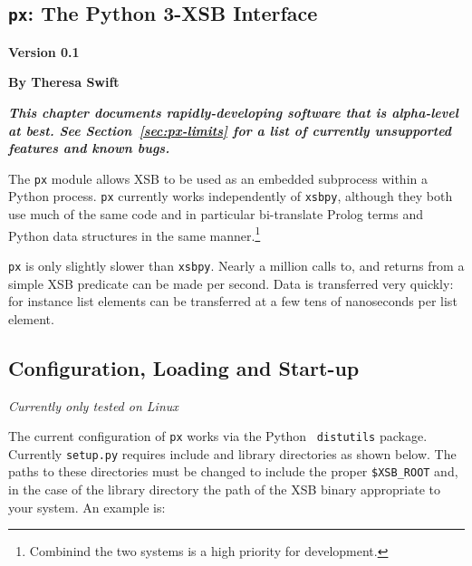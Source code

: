 
\newcommand{\pxversion}{Version 0.1}

\begin{center}
\chapter[Python and XSB]{{\tt px}: The Python 3-XSB Interface} \label{chap:px}
\end{center}

\vspace*{-.30in} 
\begin{center}
{\Large {\bf  \pxversion}}
\end{center}

\begin{center}
  {\Large {\bf By Theresa Swift}}
\end{center}

\noindent
{\large {\bf {\em This chapter documents rapidly-developing software
      that is alpha-level at best.  See Section~\ref{sec:px-limits}
      for a list of currently unsupported features and known bugs.}}}

The {\tt px} module allows XSB to be used as an embedded subprocess
within a Python process.  {\tt px} currently works independently of
{\tt xsbpy}, although they both use much of the same code and in
particular bi-translate Prolog terms and Python data structures in the
same manner.\footnote{Combinind the two systems is a high priority
  for development.}

{\tt px} is only slightly slower than {\tt xsbpy}.  Nearly a million
calls to, and returns from a simple XSB predicate can be made per
second.  Data is transferred very quickly: for instance list elements
can be transferred at a few tens of nanoseconds per list element.

\section{Configuration, Loading and Start-up}

{\em Currently only tested on Linux}

The current configuration of {\tt px} works via the Python {\tt
  distutils} package.  Currently {\tt setup.py} requires include and
library directories as shown below.  The paths to these directories
must be changed to include the proper {\tt \$XSB\_ROOT} and, in the
case of the library directory the path of the XSB binary appropriate
to your system.  An example is:

